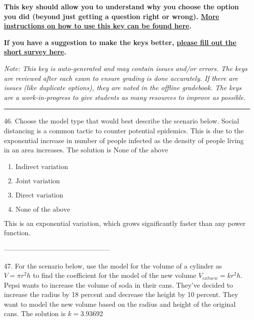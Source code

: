 \documentclass{extbook}[14pt]
\begin{document}
\textbf{This key should allow you to understand why you choose the option you did (beyond just getting a question right or wrong). \href{https://xronos.clas.ufl.edu/mac1105spring2020/courseDescriptionAndMisc/Exams/LearningFromResults}{More instructions on how to use this key can be found here}.}

\textbf{If you have a suggestion to make the keys better, \href{https://forms.gle/CZkbZmPbC9XALEE88}{please fill out the short survey here}.}

\textit{Note: This key is auto-generated and may contain issues and/or errors. The keys are reviewed after each exam to ensure grading is done accurately. If there are issues (like duplicate options), they are noted in the offline gradebook. The keys are a work-in-progress to give students as many resources to improve as possible.}

\rule{\textwidth}{0.4pt}

46. Choose the model type that would best describe the scenario below.
Social distancing is a common tactic to counter potential epidemics. This is due to the exponential increase in number of people infected as the density of people living in an area increases. 
The solution is $ \text{None of the above} $ 

\begin{enumerate}[label=\Alph*.] 
\item $ \text{Indirect variation} $ 

  
\item $ \text{Joint variation} $ 

  
\item $ \text{Direct variation} $ 

  
\item $ \text{None of the above} $ 

  
\end{enumerate} 
 
This is an exponential variation, which grows significantly faster than any power function.

-----------------------------------------------

47. For the scenario below, use the model for the volume of a cylinder as $V = \pi r^2 h$ to find the coefficient for the model of the new volume $V_{	ext{new}} = k r^2 h$.
Pepsi wants to increase the volume of soda in their cans. They've decided to increase the radius by 18 percent and decrease the height by 10 percent. They want to model the new volume based on the radius and height of the original cans. 
The solution is $ k = 3.93692 $ 
\end{document}
